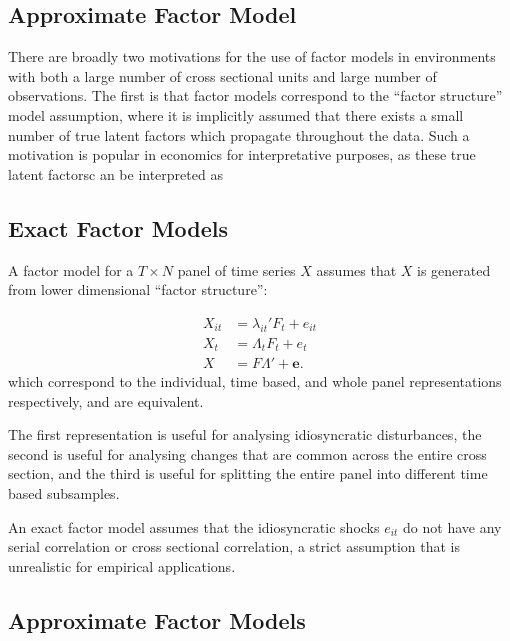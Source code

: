 \documentclass[
]{article}
\begin{document}
\subsection{Approximate Factor Model}



There are broadly two motivations for the use of factor models in
environments with both a large number of cross sectional units and large
number of observations. The first is that factor models correspond to
the ``factor structure'' model assumption, where it is implicitly
assumed that there exists a small number of true latent factors which
propagate throughout the data. Such a motivation is popular in economics
for interpretative purposes, as these true latent factorsc an be
interpreted as

\hypertarget{exact-factor-models}{%
\subsection{Exact Factor Models}\label{exact-factor-models}}

A factor model for a \(T \times N\) panel of time series \(X\) assumes
that \(X\) is generated from lower dimensional ``factor structure'':

\[
\begin{aligned}
X_{it} &= \lambda_{it}' F_t + e_{it} \\
X_t &= \Lambda_t F_t + e_t \\
X &= F \Lambda' + \mathbf{e}.
\end{aligned}
\] which correspond to the individual, time based, and whole panel
representations respectively, and are equivalent.

The first representation is useful for analysing idiosyncratic
disturbances, the second is useful for analysing changes that are common
across the entire cross section, and the third is useful for splitting
the entire panel into different time based subsamples.

An exact factor model assumes that the idiosyncratic shocks \(e_{it}\)
do not have any serial correlation or cross sectional correlation, a
strict assumption that is unrealistic for empirical applications.

\hypertarget{approximate-factor-models}{%
\subsection{Approximate Factor Models}\label{approximate-factor-models}}
\end{document}
